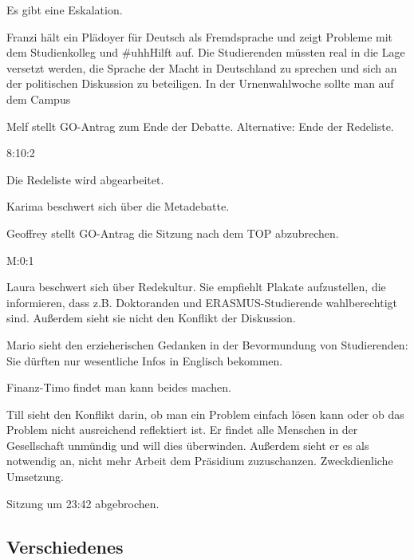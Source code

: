\documentclass[ngerman,headheight=70pt]{scrartcl}
\begin{document}
    Es gibt eine Eskalation.

    Franzi hält ein Plädoyer für Deutsch als Fremdsprache und zeigt Probleme
    mit dem Studienkolleg und #uhhHilft auf. Die Studierenden müssten real in
    die Lage versetzt werden, die Sprache der Macht in Deutschland zu sprechen
    und sich an der politischen Diskussion zu beteiligen.
    In der Urnenwahlwoche sollte man auf dem Campus

    Melf stellt GO-Antrag zum Ende der Debatte. Alternative: Ende der Redeliste.

    8:10:2

    Die Redeliste wird abgearbeitet.

    Karima beschwert sich über die Metadebatte.

    Geoffrey stellt GO-Antrag die Sitzung nach dem TOP abzubrechen.

    M:0:1

    Laura beschwert sich über Redekultur. Sie empfiehlt Plakate aufzustellen,
    die informieren, dass z.B. Doktoranden und ERASMUS-Studierende wahlberechtigt
    sind. Außerdem sieht sie nicht den Konflikt der Diskussion.

    Mario sieht den erzieherischen Gedanken in der Bevormundung von Studierenden:
    Sie dürften nur wesentliche Infos in Englisch bekommen.

    Finanz-Timo findet man kann beides machen.

    Till sieht den Konflikt darin, ob man ein Problem einfach lösen kann oder
    ob das Problem nicht ausreichend reflektiert ist. Er findet alle Menschen
    in der Gesellschaft unmündig und will dies überwinden. Außerdem sieht er
    es als notwendig an, nicht mehr Arbeit dem Präsidium zuzuschanzen. Zweckdienliche
    Umsetzung.

    Sitzung um 23:42 abgebrochen.


    \subsection{Verschiedenes}
\end{document}
